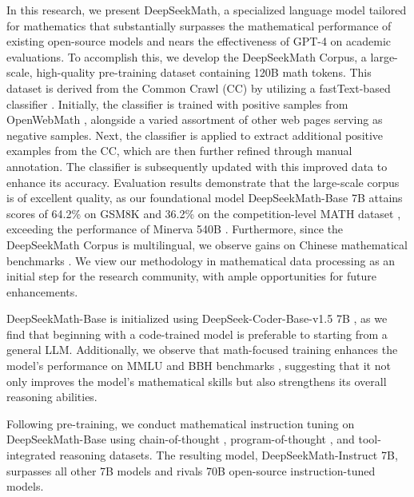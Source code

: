 In this research, we present DeepSeekMath, a specialized language model tailored for mathematics that substantially surpasses the mathematical performance of existing open-source models and nears the effectiveness of GPT-4 on academic evaluations. To accomplish this, we develop the DeepSeekMath Corpus, a large-scale, high-quality pre-training dataset containing 120B math tokens. This dataset is derived from the Common Crawl (CC) by utilizing a fastText-based classifier \citep{joulin2016fasttext}. Initially, the classifier is trained with positive samples from OpenWebMath \citep{openwebmath}, alongside a varied assortment of other web pages serving as negative samples. Next, the classifier is applied to extract additional positive examples from the CC, which are then further refined through manual annotation. The classifier is subsequently updated with this improved data to enhance its accuracy. Evaluation results demonstrate that the large-scale corpus is of excellent quality, as our foundational model DeepSeekMath-Base 7B attains scores of 64.2\% on GSM8K \citep{gsm8k} and 36.2\% on the competition-level MATH dataset \citep{MATH}, exceeding the performance of Minerva 540B \citep{minerva}. Furthermore, since the DeepSeekMath Corpus is multilingual, we observe gains on Chinese mathematical benchmarks \citep{wei2023cmath,agieval}. We view our methodology in mathematical data processing as an initial step for the research community, with ample opportunities for future enhancements.

DeepSeekMath-Base is initialized using DeepSeek-Coder-Base-v1.5 7B \citep{deepseek-coder}, as we find that beginning with a code-trained model is preferable to starting from a general LLM. Additionally, we observe that math-focused training enhances the model's performance on MMLU \citep{mmlu} and BBH benchmarks \citep{bbh}, suggesting that it not only improves the model's mathematical skills but also strengthens its overall reasoning abilities.

Following pre-training, we conduct mathematical instruction tuning on DeepSeekMath-Base using chain-of-thought \citep{cot}, program-of-thought \citep{pot,pal}, and tool-integrated reasoning \citep{tora} datasets. The resulting model, DeepSeekMath-Instruct 7B, surpasses all other 7B models and rivals 70B open-source instruction-tuned models.

